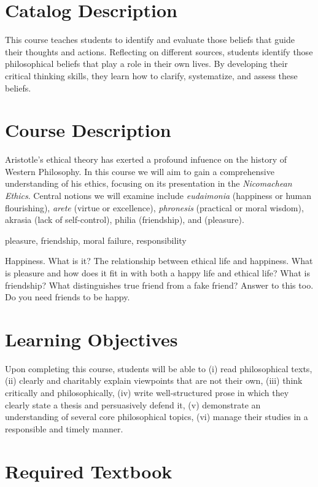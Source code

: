 \documentclass[article,oneside]{memoir}
\begin{document}
\section{Catalog Description}

This course teaches students to identify and evaluate those beliefs that guide their thoughts and actions. Reflecting on different sources, students identify those philosophical beliefs that play a role in their own lives. By developing their critical thinking skills, they learn how to clarify, systematize, and assess these beliefs. 

\section{Course Description}

Aristotle's ethical theory has exerted a profound infuence on the history of Western Philosophy.  In this course we will aim to gain a comprehensive understanding of his ethics, focusing on its presentation in the \emph{Nicomachean Ethics}.  Central notions we will examine include \emph{eudaimonia} (happiness or human  flourishing), \emph{arete} (virtue or excellence), \emph{phronesis} (practical or moral wisdom), akrasia (lack  of  self-control), philia (friendship),  and  (pleasure).   

pleasure, friendship, moral failure, responsibility 


Happiness. 
What is it? The relationship between ethical life and happiness. What is pleasure and how does it fit in with both a happy life and ethical life? What is friendship? What distinguishes true friend from a fake friend? Answer to this too. Do you need friends to be happy. 

\section{Learning Objectives}

Upon completing this course, students will be able to (i) read
philosophical texts, (ii) clearly and charitably explain viewpoints that
are not their own, (iii) think critically and philosophically, (iv)
write well-structured prose in which they clearly state a thesis and
persuasively defend it, (v) demonstrate an understanding of several core
philosophical topics, (vi) manage their studies in a responsible and timely manner. 




\section{Required Textbook}
\end{document}
